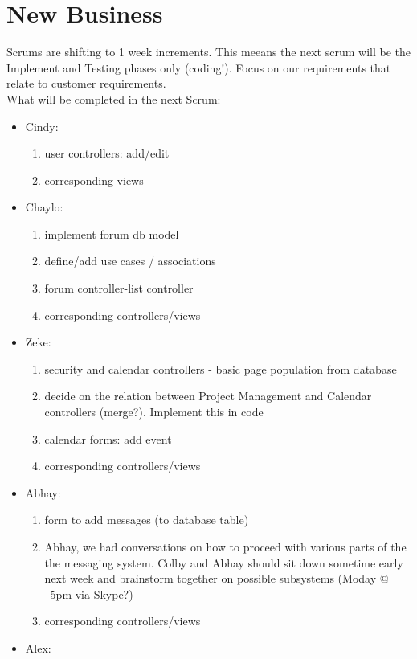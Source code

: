 \documentclass[12pt]{article}
\begin{document}
\section{New Business}
Scrums are shifting to 1 week increments. This meeans the next scrum will be the Implement and Testing phases only (coding!). Focus on our requirements that relate to customer requirements.\\
What will be completed in the next Scrum:\\
\begin{itemize}
\item Cindy:
\begin{enumerate}
 \item user controllers: add/edit
 \item corresponding views
\end{enumerate}
\item Chaylo:
\begin{enumerate}
 \item implement forum db model
 \item define/add use cases / associations
 \item forum controller-list controller
 \item corresponding controllers/views
\end{enumerate}
\item Zeke:
\begin{enumerate}
 \item security and calendar controllers - basic page population from database
 \item decide on the relation between Project Management and Calendar controllers (merge?). Implement this in code
 \item calendar forms: add event
 \item corresponding controllers/views  
\end{enumerate}
\item Abhay:
\begin{enumerate}
 \item form to add messages (to database table)
 \item Abhay, we had conversations on how to proceed with various parts of the the messaging system. Colby and Abhay should sit down sometime early next week and brainstorm together on possible subsystems (Moday @ ~5pm via Skype?)
 \item corresponding controllers/views  
\end{enumerate}
\item Alex:
\begin{enumerate}

\end{enumerate}
\end{itemize}
\end{document}
